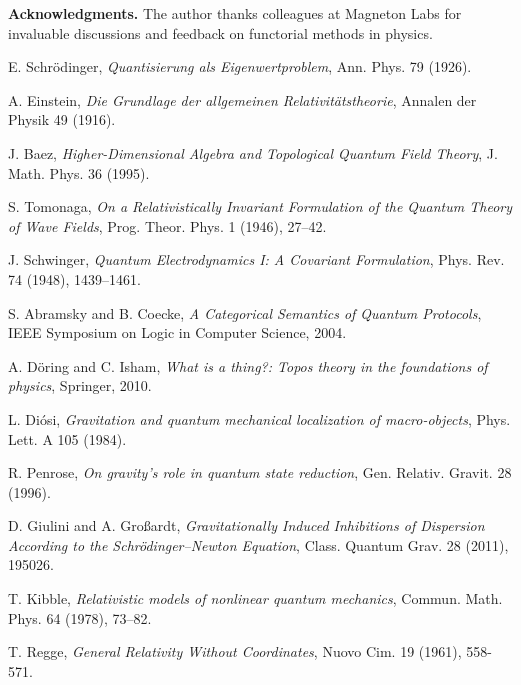 \documentclass[12pt]{article}
\begin{document}
\vspace{0.5em}
\noindent\textbf{Acknowledgments.} The author thanks colleagues at Magneton Labs for invaluable discussions and feedback on functorial methods in physics.

\begin{thebibliography}{99}
E. Schrödinger, \textit{Quantisierung als Eigenwertproblem}, Ann. Phys. 79 (1926).

A. Einstein, \textit{Die Grundlage der allgemeinen Relativitätstheorie}, Annalen der Physik 49 (1916).

J. Baez, \textit{Higher-Dimensional Algebra and Topological Quantum Field Theory}, J. Math. Phys. 36 (1995).

S. Tomonaga, \textit{On a Relativistically Invariant Formulation of the Quantum Theory of Wave Fields}, Prog. Theor. Phys. 1 (1946), 27–42.

J. Schwinger, \textit{Quantum Electrodynamics I: A Covariant Formulation}, Phys. Rev. 74 (1948), 1439–1461.

S. Abramsky and B. Coecke, \textit{A Categorical Semantics of Quantum Protocols}, IEEE Symposium on Logic in Computer Science, 2004.

A. Döring and C. Isham, \textit{What is a thing?: Topos theory in the foundations of physics}, Springer, 2010.

L. Di\'osi, \textit{Gravitation and quantum mechanical localization of macro-objects}, Phys. Lett. A 105 (1984).

R. Penrose, \textit{On gravity's role in quantum state reduction}, Gen. Relativ. Gravit. 28 (1996).

D. Giulini and A. Gro{\ss}ardt, \textit{Gravitationally Induced Inhibitions of Dispersion According to the Schrödinger–Newton Equation}, Class. Quantum Grav. 28 (2011), 195026.

T. Kibble, \textit{Relativistic models of nonlinear quantum mechanics}, Commun. Math. Phys. 64 (1978), 73–82.

T. Regge, \textit{General Relativity Without Coordinates}, Nuovo Cim. 19 (1961), 558-571.
\end{thebibliography}
\end{document}
